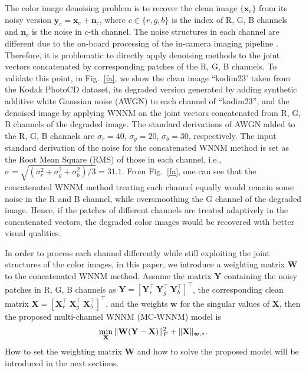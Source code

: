 \documentclass[10pt,twocolumn,letterpaper,sort&compress]{article}
\begin{document}
The color image denoising problem is to recover the clean image $\{\mathbf{x}_{c}\}$ from its noisy version $\mathbf{y}_{c}=\mathbf{x}_{c}+\mathbf{n}_{c}$, where $c\in \{r, g, b\}$ is the index of R, G, B channels and $\mathbf{n}_{c}$ is the noise in $c$-th channel. The noise structures in each channel are different due to the on-board processing of the in-camera imaging pipeline \cite{karaimer_brown_ECCV_2016}. Therefore, it is problematic to directly apply denoising methods to the joint vectors concatenated by corresponding patches of the R, G, B channels. To validate this point, in Fig.\ \ref{fa}, we show the clean image ``kodim23' taken from the Kodak PhotoCD dataset, its degraded version generated by adding synthetic additive white Gaussian noise (AWGN) to each channel of ``kodim23'', and the denoised image by applying WNNM \cite{wnnm} on the joint vectors concatenated from R, G, B channels of the degraded image. The standard derivations of AWGN added to the R, G, B channels are $\sigma_{r}=40$, $\sigma_{g}=20$, $\sigma_{b}=30$, respectively. The input standard derivation of the noise for the concatenated WNNM method is set as the Root Mean Square (RMS) of those in each channel, i.e., $\sigma=\sqrt{(\sigma_{r}^{2}+\sigma_{g}^{2}+\sigma_{b}^{2})/3}=31.1$. From Fig.\ \ref{fa}, one can see that the concatenated WNNM method treating each channel equally would remain some noise in the R and B channel, while oversmoothing the G channel of the degraded image. Hence, if the patches of different channels are treated adaptively in the concatenated vectors, the degraded color images would be recovered with better visual qualities.

In order to process each channel differently while still exploiting the joint structures of the color images, in this paper, we introduce a weighting matrix $\mathbf{W}$ to the concatenated WNNM method. Assume the matrix $\mathbf{Y}$ containing the noisy patches in R, G, B channels as $\mathbf{Y}=[\mathbf{Y}_{r}^{\top}\ \mathbf{Y}_{g}^{\top}\ \mathbf{Y}_{b}^{\top}]^{\top}$, the corresponding clean matrix $\mathbf{X}=[\mathbf{X}_{r}^{\top}\ \mathbf{X}_{g}^{\top}\ \mathbf{X}_{b}^{\top}]^{\top}$, and the weights $\bm{w}$ for the singular values of $\mathbf{X}$, then the proposed multi-channel WNNM (MC-WNNM) model is
\vspace{-3mm}
\begin{equation}
\label{e4}
\vspace{-2mm}
\min_{\mathbf{X}}\|\mathbf{W}(\mathbf{Y}-\mathbf{X})\|_{F}^{2}
+ 
\|\mathbf{X}\|_{\bm{w},*}.
\end{equation}
How to set the weighting matrix $\mathbf{W}$ and how to solve the proposed model will be introduced in the next sections.
\end{document}
